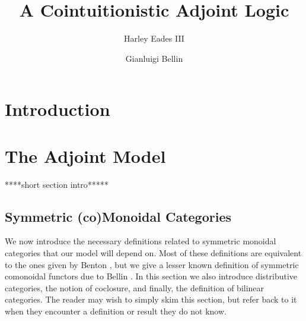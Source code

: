 \documentclass{lmcs}
\date{}
\begin{document}
\title{A Cointuitionistic Adjoint Logic}
\author{Harley Eades III}
\address{Computer Science, Augusta University, Augusta, GA}

\author{Gianluigi Bellin}
\address{Dipartimento di Informatica, Universit\`{a} di Verona, Strada Le Grazie, 37134 Verona, Italy}

\maketitle 

\begin{abstract}

  

\end{abstract}

\section{Introduction}
\label{sec:introduction}


\section{The Adjoint Model}
\label{sec:adjoint_model}

****short section intro*****

\subsection{Symmetric (co)Monoidal Categories}
\label{subsec:symmetric_monoidal_categories}
We now introduce the necessary definitions related to symmetric
monoidal categories that our model will depend on.  Most of these
definitions are equivalent to the ones given by Benton
\cite{Benton:1994}, but we give a lesser known definition of symmetric
comonoidal functors due to Bellin \cite{Bellin:2012}.  In this
section we also introduce distributive categories, the notion of
coclosure, and finally, the definition of bilinear categories.  The
reader may wish to simply skim this section, but refer back to it when
they encounter a definition or result they do not know.
\end{document}
